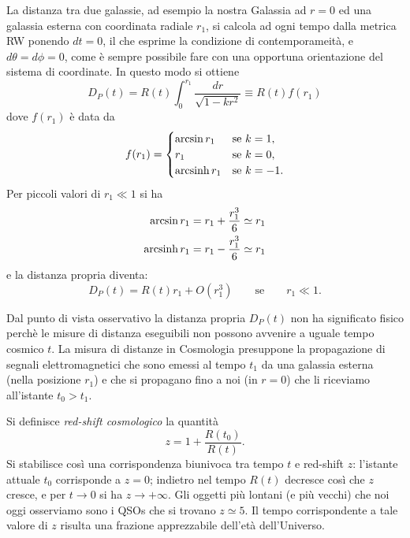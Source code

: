 La distanza tra due galassie, ad esempio la nostra Galassia ad $r=0$ ed una
galassia esterna con coordinata radiale $r_1$, si calcola ad ogni tempo dalla
metrica RW ponendo $dt=0$, il che esprime la condizione di contemporameità, e $d
\theta = d \phi =0$, come è sempre possibile fare con una opportuna orientazione
del sistema di coordinate.  In questo modo si ottiene
\begin{equation}
  D_P(t) = R(t) \int_0^{r_1} \frac{dr}{\sqrt{1-kr^2}} \equiv R(t) f(r_1)
  \label{dprop}
\end{equation}
dove $f(r_1)$ è data da
\begin{equation}
  f(r_{1}) =
  \begin{cases}
    \arcsin r_{1}  & \text{se } k = 1, \\
    r_{1}        & \text{se } k = 0, \\
    \operatorname{arcsinh} r_{1} & \text{se } k = -1.
  \end{cases}
\end{equation}
Per piccoli valori di $r_1\ll 1$ si ha
\begin{subequations}
  \begin{align}
    \arcsin r_1 &= r_1 +\frac{r_1^3}{6}  \simeq r_1 \\
    \operatorname{arcsinh} r_1 &= r_1 -\frac{r_1^3}{6}  \simeq r_1
  \end{align}
\end{subequations}
e la distanza propria diventa:
\begin{equation}
  D_P(t) = R(t) r_1 + O(r_1^3) \qquad\text{se}\qquad r_1 \ll 1.
\end{equation}

Dal punto di vista osservativo la distanza propria $D_P(t)$ non ha significato
fisico perchè le misure di distanza eseguibili non possono avvenire a uguale
tempo cosmico $t$.  La misura di distanze in Cosmologia presuppone la
propagazione di segnali elettromagnetici che sono emessi al tempo $t_1$ da una
galassia esterna (nella posizione $r_1$) e che si propagano fino a noi (in
$r=0$) che li riceviamo all'istante $t_0>t_1$.

Si definisce \emph{red-shift cosmologico} la quantità
\begin{equation}
  z = 1 + \frac{R(t_0)}{R(t)}.
\end{equation}
Si stabilisce così una corrispondenza biunivoca tra tempo $t$ e red-shift $z$:
l'istante attuale $t_0$ corrisponde a $z=0$; indietro nel tempo $R(t)$ decresce
così che $z$ cresce, e per $t \to 0$ si ha $z \to +\infty$.  Gli oggetti più
lontani (e più vecchi) che noi oggi osserviamo sono i QSOs che si trovano $z
\simeq 5$.  Il tempo corrispondente a tale valore di $z$ risulta una frazione
apprezzabile dell'età dell'Universo.


